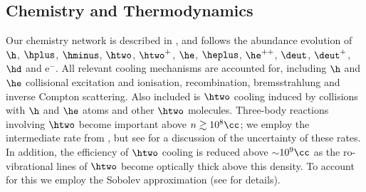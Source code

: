 \subsection{Chemistry and Thermodynamics}
\label{chemistry}
 Our chemistry network is described in \citet{Greifetal2009b}, and follows the abundance evolution of $\h$, $\hplus$, $\hminus$, $\htwo$, $\htwo^+$, $\he$, $\heplus$, $\he^{++}$, $\deut$, $\deut^+$, $\hd$ and e$^-$. All relevant cooling mechanisms are accounted for, including $\h$ and $\he$ collisional excitation and ionisation, recombination, bremsstrahlung and inverse Compton scattering. Also included is $\htwo$ cooling induced by collisions with $\h$ and $\he$ atoms and other $\htwo$ molecules.  Three-body reactions involving $\htwo$ become important above $n \gtrsim 10^8\cc$; we employ the intermediate rate from \citet{PallaSalpeterStahler1983}, but see \citet{Turketal2011} for a discussion of the uncertainty of these rates.
In addition, the efficiency of $\htwo$ cooling is reduced above $\sim$$10^9\cc$ as the ro-vibrational lines of $\htwo$ become optically thick above this density.  To account for this we employ the Sobolev approximation (see \citealt{Yoshidaetal2006, Greifetal2011} for details). 